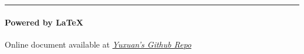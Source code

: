 \vfill
\noindent\rule{\textwidth}{0.1pt}
\vspace{-30pt}
\paragraph*{Powered by \LaTeX}
\hfill Online document available at \textit{\href{https://courses.yuxuanzhang.net}{Yuxuan's Github Repo}}
